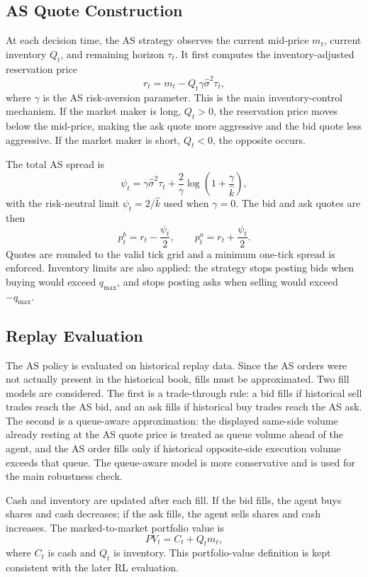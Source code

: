 \documentclass[oneside]{uva-inf-bachelor-thesis}
\begin{document}
\subsection{AS Quote Construction}

At each decision time, the AS strategy observes the current mid-price \(m_t\), current
inventory \(Q_t\), and remaining horizon \(\tau_t\). It first computes the
inventory-adjusted reservation price
\[
    r_t = m_t - Q_t\gamma \widehat{\sigma}^{2}\tau_t,
\]
where \(\gamma\) is the AS risk-aversion parameter. This is the main inventory-control
mechanism. If the market maker is long, \(Q_t>0\), the reservation price moves below
the mid-price, making the ask quote more aggressive and the bid quote less aggressive.
If the market maker is short, \(Q_t<0\), the opposite occurs.

The total AS spread is
\[
    \psi_t
    =
    \gamma \widehat{\sigma}^{2}\tau_t
    +
    \frac{2}{\gamma}
    \log\left(1+\frac{\gamma}{\widehat{k}}\right),
\]
with the risk-neutral limit \(\psi_t = 2/\widehat{k}\) used when \(\gamma=0\). The bid
and ask quotes are then
\[
    p^b_t = r_t - \frac{\psi_t}{2},
    \qquad
    p^a_t = r_t + \frac{\psi_t}{2}.
\]
Quotes are rounded to the valid tick grid and a minimum one-tick spread is enforced.
Inventory limits are also applied: the strategy stops posting bids when buying would
exceed \(q_{\max}\), and stops posting asks when selling would exceed \(-q_{\max}\).

\subsection{Replay Evaluation}

The AS policy is evaluated on historical replay data. Since the AS orders were not
actually present in the historical book, fills must be approximated. Two fill models
are considered. The first is a trade-through rule: a bid fills if historical sell trades
reach the AS bid, and an ask fills if historical buy trades reach the AS ask. The second
is a queue-aware approximation: the displayed same-side volume already resting at
the AS quote price is treated as queue volume ahead of the agent, and the AS order
fills only if historical opposite-side execution volume exceeds that queue. The
queue-aware model is more conservative and is used for the main robustness check.

Cash and inventory are updated after each fill. If the bid fills, the agent buys shares
and cash decreases; if the ask fills, the agent sells shares and cash increases. The
marked-to-market portfolio value is
\[
    PV_t = C_t + Q_t m_t,
\]
where \(C_t\) is cash and \(Q_t\) is inventory. This portfolio-value definition is kept
consistent with the later RL evaluation.
\end{document}
